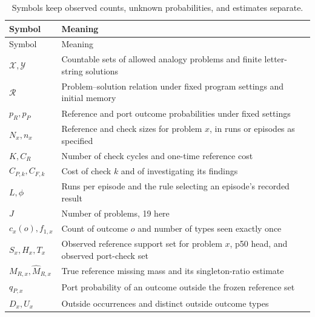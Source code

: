 \documentclass[10pt,letterpaper]{article}
\begin{document}
\begin{longtable}[]{@{}
  >{\raggedright\arraybackslash}p{}
  >{\raggedright\arraybackslash}p{}@{}}
\caption{Symbols keep observed counts, unknown probabilities, and estimates
separate.}\tabularnewline
\toprule\noalign{}
\begin{minipage}[b]{\linewidth}\raggedright
Symbol
\end{minipage} & \begin{minipage}[b]{\linewidth}\raggedright
Meaning
\end{minipage} \\
\midrule\noalign{}
\endfirsthead
\toprule\noalign{}
\begin{minipage}[b]{\linewidth}\raggedright
Symbol
\end{minipage} & \begin{minipage}[b]{\linewidth}\raggedright
Meaning
\end{minipage} \\
\midrule\noalign{}
\endhead
\bottomrule\noalign{}
\endlastfoot
\(\mathcal X,\mathcal Y\) & Countable sets of allowed analogy problems and finite
letter-string solutions \\
\(\mathcal R\) & Problem--solution relation under fixed program settings and initial
memory \\
\(p_R,p_P\) & Reference and port outcome probabilities under fixed settings \\
\(N_x,n_x\) & Reference and check sizes for problem \(x\), in runs or episodes as
specified \\
\(K,C_R\) & Number of check cycles and one-time reference cost \\
\(C_{P,k},C_{F,k}\) & Cost of check \(k\) and of investigating its findings \\
\(L,\phi\) & Runs per episode and the rule selecting an episode's recorded result \\
\(J\) & Number of problems, 19 here \\
\(c_x(o),f_{1,x}\) & Count of outcome \(o\) and number of types seen exactly once \\
\(S_x,H_x,T_x\) & Observed reference support set for problem \(x\), p50 head, and observed
port-check set \\
\(M_{R,x},\widehat M_{R,x}\) & True reference missing mass and its singleton-ratio
estimate \\
\(q_{P,x}\) & Port probability of an outcome outside the frozen reference set \\
\(D_x,U_x\) & Outside occurrences and distinct outside outcome types \\
\end{longtable}
\end{document}
